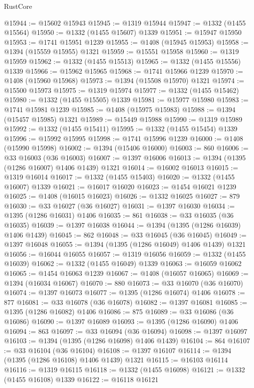 \begin{lexlean}{RustCore}
\begin{coremodule}
@15944 := @15602 @15943
@15945 := @1319 @15944
@15947 := @1332 (@1455 @15564)
@15950 := @1332 (@1455 @15607) @1339
@15951 := @15947 @15950
@15953 := @1741 @15951 @1239
@15955 := @1408 (@15945 @15953)
@15958 := @1394 (@15559 @15955) @1321
@15959 := @15551 @15958
@15960 := @1319 @15959
@15962 := @1332 (@1455 @15513)
@15965 := @1332 (@1455 @15556) @1339
@15966 := @15962 @15965
@15968 := @1741 @15966 @1239
@15970 := @1408 (@15960 @15968)
@15973 := @1394 (@15508 @15970) @1321
@15974 := @15500 @15973
@15975 := @1319 @15974
@15977 := @1332 (@1455 @15462)
@15980 := @1332 (@1455 @15505) @1339
@15981 := @15977 @15980
@15983 := @1741 @15981 @1239
@15985 := @1408 (@15975 @15983)
@15988 := @1394 (@15457 @15985) @1321
@15989 := @15449 @15988
@15990 := @1319 @15989
@15992 := @1332 (@1455 @15411)
@15995 := @1332 (@1455 @15454) @1339
@15996 := @15992 @15995
@15998 := @1741 @15996 @1239
@16000 := @1408 (@15990 @15998)
@16002 := @1394 (@15406 @16000)
@16003 := 860
@16006 := @33 @16003 (@36 @16003)
@16007 := @1397 @16006
@16013 := @1394 (@1395 (@1286 @16007) @1406 @1439) @1321
@16014 := @16002 @16013
@16015 := @1319 @16014
@16017 := @1332 (@1455 @15403)
@16020 := @1332 (@1455 @16007) @1339
@16021 := @16017 @16020
@16023 := @1454 @16021 @1239
@16025 := @1408 (@16015 @16023)
@16026 := @1332 @16025
@16027 := 879
@16030 := @33 @16027 (@36 @16027)
@16031 := @1397 @16030
@16034 := @1395 (@1286 @16031) @1406
@16035 := 861
@16038 := @33 @16035 (@36 @16035)
@16039 := @1397 @16038
@16044 := @1394 (@1395 (@1286 @16039) @1406 @1439)
@16045 := 862
@16048 := @33 @16045 (@36 @16045)
@16049 := @1397 @16048
@16055 := @1394 (@1395 (@1286 @16049) @1406 @1439) @1321
@16056 := @16044 @16055
@16057 := @1319 @16056
@16059 := @1332 (@1455 @16039)
@16062 := @1332 (@1455 @16049) @1339
@16063 := @16059 @16062
@16065 := @1454 @16063 @1239
@16067 := @1408 (@16057 @16065)
@16069 := @1394 (@16034 @16067)
@16070 := 880
@16073 := @33 @16070 (@36 @16070)
@16074 := @1397 @16073
@16077 := @1395 (@1286 @16074) @1406
@16078 := 877
@16081 := @33 @16078 (@36 @16078)
@16082 := @1397 @16081
@16085 := @1395 (@1286 @16082) @1406
@16086 := 875
@16089 := @33 @16086 (@36 @16086)
@16090 := @1397 @16089
@16093 := @1395 (@1286 @16090) @1406
@16094 := 863
@16097 := @33 @16094 (@36 @16094)
@16098 := @1397 @16097
@16103 := @1394 (@1395 (@1286 @16098) @1406 @1439)
@16104 := 864
@16107 := @33 @16104 (@36 @16104)
@16108 := @1397 @16107
@16114 := @1394 (@1395 (@1286 @16108) @1406 @1439) @1321
@16115 := @16103 @16114
@16116 := @1319 @16115
@16118 := @1332 (@1455 @16098)
@16121 := @1332 (@1455 @16108) @1339
@16122 := @16118 @16121

\end{coremodule}
\end{lexlean}
